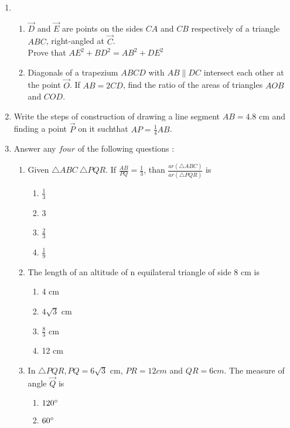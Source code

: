 %
\begin{enumerate}
\item
		\begin{enumerate}
			\item $ \vec{D} $ and $ \vec{E} $ are points on the sides $ CA $ and $ CB $ respectively 
				of a triangle $ ABC $, right-angled at $ \vec{C} $. \\
		        Prove that $ AE^2 + BD^2 =AB^2 + DE^2 $ 

			\item Diagonals of a trapezium $ ABCD $ with $ AB \parallel DC $ intersect each other at 
				the point $ \vec{O} $. If $ AB =2 CD $, find the ratio of the areas of triangles 
				$ AOB $ and $ COD $. 
		\end{enumerate}
	\item Write the steps of construction of drawing a line segment $ AB = 4.8 $ cm and finding a point 
		$ \vec{P} $ on it suchthat $ AP = \frac{1}{4} AB $. 
	\item Answer any $ four $ of the following questions : 
		\begin{enumerate}
		\item Given $ \triangle ABC ~ \triangle PQR $. If $ \frac{AB}{PQ} = \frac{1}{3} $, than 
			$ \frac{ar(\triangle ABC)}{ar(\triangle PQR)} $ is
			\begin{enumerate}
			\item $ \frac{1}{3} $
			\item 3
			\item $ \frac{2}{3} $
			\item $ \frac{1}{9} $
			\end{enumerate}
		\item The length of an altitude of n equilateral triangle of side 8 cm is
			\begin{enumerate}
				\item 4 cm
				\item $ 4\sqrt{3} $ cm
				\item $ \frac{8}{3} $ cm
				\item 12 cm
			\end{enumerate}
		\item In $ \triangle PQR, PQ = 6 \sqrt{3} $ cm, $ PR = 12 cm $ and $ QR = 6 cm $. The measure of 
			angle $ \vec{Q} $ is
			\begin{enumerate}
		\item $ 120{\degree} $
		\item $ 60{\degree} $

\end{enumerate}
\end{enumerate}
\end{enumerate}
